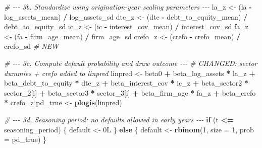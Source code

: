 \documentclass[
]{article}
\newenvironment{Shaded}{\begin{snugshade}}{\end{snugshade}}
\newcommand{\AttributeTok}[1]{\textcolor[rgb]{0.13,0.29,0.53}{#1}}
\newcommand{\CommentTok}[1]{\textcolor[rgb]{0.56,0.35,0.01}{\textit{#1}}}
\newcommand{\ControlFlowTok}[1]{\textcolor[rgb]{0.13,0.29,0.53}{\textbf{#1}}}
\newcommand{\DataTypeTok}[1]{\textcolor[rgb]{0.13,0.29,0.53}{#1}}
\newcommand{\DecValTok}[1]{\textcolor[rgb]{0.00,0.00,0.81}{#1}}
\newcommand{\FunctionTok}[1]{\textcolor[rgb]{0.13,0.29,0.53}{\textbf{#1}}}
\newcommand{\NormalTok}[1]{#1}
\newcommand{\OtherTok}[1]{\textcolor[rgb]{0.56,0.35,0.01}{#1}}
\newcommand{\SpecialCharTok}[1]{\textcolor[rgb]{0.81,0.36,0.00}{\textbf{#1}}}
\begin{document}
\begin{Shaded}
\begin{Highlighting}[]
      \CommentTok{\# {-}{-}{-} 3b. Standardize using origination{-}year scaling parameters {-}{-}{-}}
\NormalTok{      la\_z    }\OtherTok{\textless{}{-}}\NormalTok{ (la    }\SpecialCharTok{{-}}\NormalTok{ log\_assets\_mean)     }\SpecialCharTok{/}\NormalTok{ log\_assets\_sd}
\NormalTok{      dte\_z   }\OtherTok{\textless{}{-}}\NormalTok{ (dte   }\SpecialCharTok{{-}}\NormalTok{ debt\_to\_equity\_mean) }\SpecialCharTok{/}\NormalTok{ debt\_to\_equity\_sd}
\NormalTok{      ic\_z    }\OtherTok{\textless{}{-}}\NormalTok{ (ic    }\SpecialCharTok{{-}}\NormalTok{ interest\_cov\_mean)   }\SpecialCharTok{/}\NormalTok{ interest\_cov\_sd}
\NormalTok{      fa\_z    }\OtherTok{\textless{}{-}}\NormalTok{ (fa    }\SpecialCharTok{{-}}\NormalTok{ firm\_age\_mean)        }\SpecialCharTok{/}\NormalTok{ firm\_age\_sd}
\NormalTok{      crefo\_z }\OtherTok{\textless{}{-}}\NormalTok{ (crefo }\SpecialCharTok{{-}}\NormalTok{ crefo\_mean)           }\SpecialCharTok{/}\NormalTok{ crefo\_sd   }\CommentTok{\# NEW}
      
      \CommentTok{\# {-}{-}{-} 3c. Compute default probability and draw outcome {-}{-}{-}}
      \CommentTok{\# CHANGED: sector dummies + crefo added to linpred}
\NormalTok{      linpred }\OtherTok{\textless{}{-}}\NormalTok{ beta0 }\SpecialCharTok{+}
\NormalTok{        beta\_log\_assets     }\SpecialCharTok{*}\NormalTok{ la\_z      }\SpecialCharTok{+}
\NormalTok{        beta\_debt\_to\_equity }\SpecialCharTok{*}\NormalTok{ dte\_z     }\SpecialCharTok{+}
\NormalTok{        beta\_interest\_cov   }\SpecialCharTok{*}\NormalTok{ ic\_z      }\SpecialCharTok{+}
\NormalTok{        beta\_sector2        }\SpecialCharTok{*}\NormalTok{ sector\_2[i] }\SpecialCharTok{+}
\NormalTok{        beta\_sector3        }\SpecialCharTok{*}\NormalTok{ sector\_3[i] }\SpecialCharTok{+}
\NormalTok{        beta\_firm\_age       }\SpecialCharTok{*}\NormalTok{ fa\_z      }\SpecialCharTok{+}
\NormalTok{        beta\_crefo          }\SpecialCharTok{*}\NormalTok{ crefo\_z}
\NormalTok{      pd\_true }\OtherTok{\textless{}{-}} \FunctionTok{plogis}\NormalTok{(linpred)}
      
      \CommentTok{\# {-}{-}{-} 3d. Seasoning period: no defaults allowed in early years {-}{-}{-}}
      \ControlFlowTok{if}\NormalTok{ (t }\SpecialCharTok{\textless{}=}\NormalTok{ seasoning\_period) \{}
\NormalTok{        default }\OtherTok{\textless{}{-}} \DecValTok{0}\DataTypeTok{L}
\NormalTok{      \} }\ControlFlowTok{else}\NormalTok{ \{}
\NormalTok{        default }\OtherTok{\textless{}{-}} \FunctionTok{rbinom}\NormalTok{(}\DecValTok{1}\NormalTok{, }\AttributeTok{size =} \DecValTok{1}\NormalTok{, }\AttributeTok{prob =}\NormalTok{ pd\_true)}
\NormalTok{      \}}
      

\end{Highlighting}
\end{Shaded}
\end{document}

